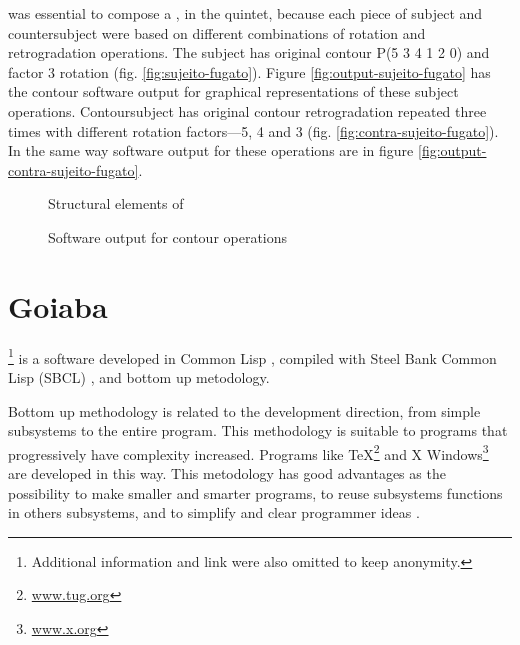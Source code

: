 \goiaba{} was essential to compose a , in the quintet,
because each piece of subject and countersubject were based on
different combinations of rotation and retrogradation operations.  The
subject has original contour P(5 3 4 1 2 0) and factor 3 rotation
(fig. \ref{fig:sujeito-fugato}). Figure
\ref{fig:output-sujeito-fugato} has the contour software output for
graphical representations of these subject operations. Contoursubject
has original contour retrogradation repeated three times with
different rotation factors---5, 4 and 3
(fig. \ref{fig:contra-sujeito-fugato}). In the same way software
output for these operations are in figure
\ref{fig:output-contra-sujeito-fugato}.

\begin{figure*}
  \centering

  \caption{Structural elements of }
  \label{fig:elementos-fugato}
\end{figure*}

\begin{figure*}
  \centering
  \caption{Software output for  contour operations}
  \label{fig:output-fugato}
\end{figure*}

\section{Goiaba}
\label{sec:goiaba}

\goiaba{}\footnote{Additional information and link were also omitted
  to keep anonymity.} is a software developed in Common Lisp
\cite{graham94:lisp}, compiled with Steel Bank Common Lisp (SBCL)
\cite{team07:sbcl}, and bottom up metodology.

Bottom up methodology is related to the development direction, from
simple subsystems to the entire program. This methodology is suitable
to programs that progressively have complexity increased. Programs
like \TeX{}\footnote{\url{www.tug.org}} and X
Windows\footnote{\url{www.x.org}} are developed in this way. This
metodology has good advantages as the possibility to make smaller and
smarter programs, to reuse subsystems functions in others subsystems,
and to simplify and clear programmer ideas \cite{graham94:lisp}.

